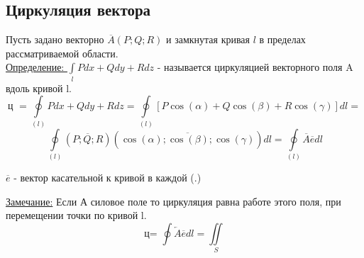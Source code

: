 \documentclass[12pt]{article}
\let\oldint\int
\let\oldiint\iint
\let\oldoint\oint
\renewcommand{\int}{\oldint\limits}
\renewcommand{\oint}{\oldoint\limits}
\renewcommand{\iint}{\oldiint\limits}
\begin{document}
  \subsection{Циркуляция вектора}
  Пусть задано векторно $\overline{A}(P;Q;R)$ и замкнутая кривая $l$ в пределах рассматриваемой области.\\
  \underline{Определение: } $\int_{l} Pdx+Qdy+Rdz$ - называется циркуляцией векторного поля A вдоль кривой l.
  \[\text{ц } =\oint_{(l)}Pdx+Qdy+Rdz=\oint_{(l)} [P\cos(\alpha)+Q\cos(\beta)+R\cos(\gamma)]dl=\]
  \[\oint_{(l)} (\overline{P;Q;R}) (\overline{\cos(\alpha);\cos(\beta);\cos(\gamma)})dl=\oint_{(l)} \overline{A} \overline{e}dl\]
  \begin{center}
    $\overline{e}$ - вектор касательной к кривой в каждой (.)
  \end{center}
  \underline{Замечание:} Если А силовое поле то циркуляция равна работе этого поля, при перемещении точки по кривой l.
  \[\text{ц= } \oint \overleftarrow{A} \overline e dl = \iint_S \]
\end{document}
